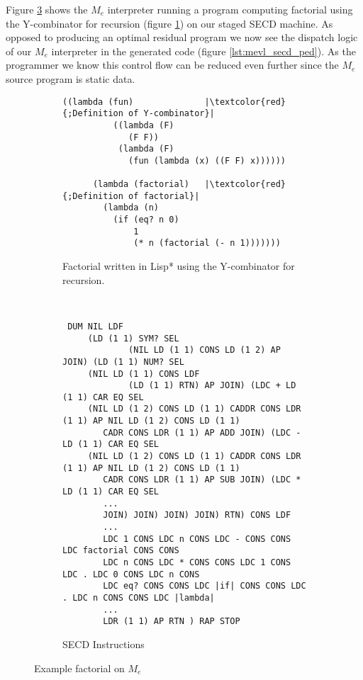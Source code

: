 \documentclass[a4paper,12pt,twoside,openright]{report}
\theoremstyle{definition}
\newcommand{\mevl}{$M_{e}$}
\begin{document}
Figure \ref{lst:mevl_secd_all} shows the \mevl{} interpreter running a program computing factorial using the Y-combinator for recursion (figure \ref{lst:mevl_secd_lisp}) on our staged SECD machine. As opposed to producing an optimal residual program we now see the dispatch logic of our \mevl{} interpreter in the generated code (figure \ref{lst:mevl_secd_ped}). As the programmer we know this control flow can be reduced even further since the \mevl{} source program is static data.


\begin{figure}[htp!]
\centering
    \begin{subfigure}{.5\linewidth}
         \centering
         \begin{verbatim}
((lambda (fun)              |\textcolor{red}{;Definition of Y-combinator}|
          ((lambda (F)
             (F F))
           (lambda (F)
             (fun (lambda (x) ((F F) x))))))

      (lambda (factorial)   |\textcolor{red}{;Definition of factorial}|
        (lambda (n)
          (if (eq? n 0)
              1
              (* n (factorial (- n 1)))))))
         \end{verbatim}
         \caption{Factorial written in Lisp* using the Y-combinator for recursion.}
         \label{lst:mevl_secd_lisp}
    \end{subfigure}\\[1ex]
    \par\bigskip
    \begin{subfigure}{\linewidth}
         \centering
         \begin{verbatim}
 DUM NIL LDF
     (LD (1 1) SYM? SEL
             (NIL LD (1 1) CONS LD (1 2) AP JOIN) (LD (1 1) NUM? SEL
     (NIL LD (1 1) CONS LDF
             (LD (1 1) RTN) AP JOIN) (LDC + LD (1 1) CAR EQ SEL
     (NIL LD (1 2) CONS LD (1 1) CADDR CONS LDR (1 1) AP NIL LD (1 2) CONS LD (1 1)
        CADR CONS LDR (1 1) AP ADD JOIN) (LDC - LD (1 1) CAR EQ SEL
     (NIL LD (1 2) CONS LD (1 1) CADDR CONS LDR (1 1) AP NIL LD (1 2) CONS LD (1 1)
        CADR CONS LDR (1 1) AP SUB JOIN) (LDC * LD (1 1) CAR EQ SEL
        ...
        JOIN) JOIN) JOIN) JOIN) RTN) CONS LDF
        ...
        LDC 1 CONS LDC n CONS LDC - CONS CONS LDC factorial CONS CONS
        LDC n CONS LDC * CONS CONS LDC 1 CONS LDC . LDC 0 CONS LDC n CONS
        LDC eq? CONS CONS LDC |if| CONS CONS LDC . LDC n CONS CONS LDC |lambda|
        ...
        LDR (1 1) AP RTN ) RAP STOP
         \end{verbatim}
    \caption{SECD Instructions}
    \label{lst:mevl_secd_ops}
    \end{subfigure}
\caption{Example factorial on \mevl}
\label{lst:mevl_secd_all}
\end{figure}
\end{document}

